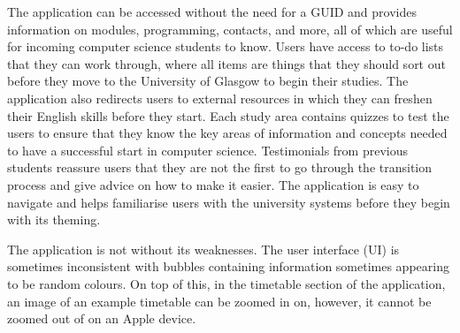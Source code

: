 \documentclass{l4proj}
\begin{document}
The application can be accessed without the need for a GUID and provides information on modules,  programming,  contacts,  and more,  all of which are useful for incoming computer science students to know. Users have access to to-do lists that they can work through,  where all items are things that they should sort out before they move to the University of Glasgow to begin their studies. The application also redirects users to external resources in which they can freshen their English skills before they start. Each study area contains quizzes to test the users to ensure that they know the key areas of information and concepts needed to have a successful start in computer science. Testimonials from previous students reassure users that they are not the first to go through the transition process and give advice on how to make it easier. The application is easy to navigate and helps familiarise users with the university systems before they begin with its theming.

The application is not without its weaknesses. The user interface (UI) is sometimes inconsistent with bubbles containing information sometimes appearing to be random colours. On top of this,  in the timetable section of the application,  an image of an example timetable can be zoomed in on,  however,  it cannot be zoomed out of on an Apple device.
\end{document}
